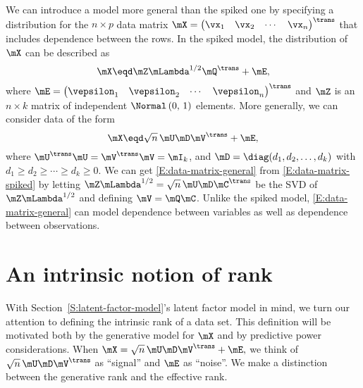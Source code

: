 We can introduce a model more general than the spiked one by specifying
a distribution for the $n\times p$ data matrix 
\(
    \mX
    =
    \left(
    \begin{matrix}
        \vx_1 &
        \vx_2 &
        \cdots &
        \vx_n
    \end{matrix}
    \right)^\trans
\)
that includes dependence between the rows.  In the spiked model, the
distribution of $\mX$ can be described as
\begin{equation}\label{E:data-matrix-spiked}
    \mX
        \eqd
        \mZ
        \mLambda^{1/2}
        \mQ^\trans
        +
        \mE,
\end{equation}
where 
\(
    \mE 
        = 
        \left(
        \begin{matrix}
            \vepsilon_1 & \vepsilon_2 & \cdots & \vepsilon_n
        \end{matrix}
        \right)^\trans
\)
and $\mZ$ is an $n \times k$ matrix of independent 
$\Normal \left( 0, \, 1 \right)$ elements.  More generally, we can consider
data of the form
\begin{equation}\label{E:data-matrix-general}
    \mX
        \eqd
            \sqrt{n} \,
            \mU
            \mD
            \mV^\trans
            +
            \mE,
\end{equation}
where $\mU^\trans \mU = \mV^\trans \mV = \mI_k$, and $\mD = \diag( d_1, d_2,
\ldots, d_k )$ with $d_1 \geq d_2 \geq \cdots \geq d_k \geq 0$. We can get
\eqref{E:data-matrix-general} from \eqref{E:data-matrix-spiked} by letting
$\mZ \mLambda^{1/2} = \sqrt{n} \, \mU \mD \mC^\trans$ be the SVD of $\mZ
\mLambda^{1/2}$ and defining $\mV = \mQ \mC$. Unlike the spiked model,
\eqref{E:data-matrix-general} can model dependence between variables as well
as dependence between observations.

\section{An intrinsic notion of rank}\label{S:intrinsic-rank}

With Section~\ref{S:latent-factor-model}'s latent factor model in mind, we
turn our attention to defining the intrinsic rank of a data set. This
definition will be motivated both by the generative model for $\mX$ and by
predictive power considerations.  When 
\(
    \mX = \sqrt{n} \, \mU \mD \mV^\trans + \mE,
\)
we think of $\sqrt{n} \, \mU \mD \mV^\trans$ as ``signal'' and $\mE$ as ``noise''.  We make a distinction between the generative rank and the effective rank.

